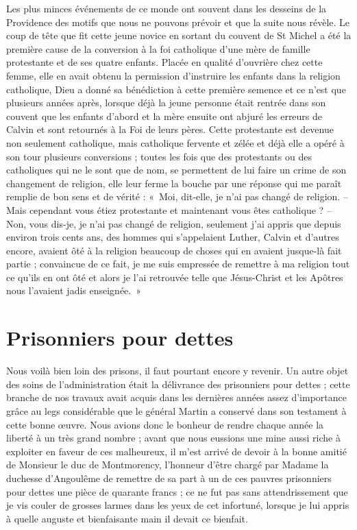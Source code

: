 \documentclass[11pt,a4paper]{report}
\begin{document}
Les plus minces événements de ce monde ont souvent dans les desseins de la Providence des motifs que nous ne pouvons prévoir et que la suite nous révèle. Le coup de tête que fit cette jeune novice en sortant du couvent de St Michel a été la première cause de la conversion à la foi catholique d'une mère de famille protestante et de ses quatre enfants. Placée en qualité d'ouvrière chez cette femme, elle en avait obtenu la permission d'instruire les enfants dans la religion catholique, Dieu a donné sa bénédiction à cette première semence et ce n'est que plusieurs années après, lorsque déjà la jeune personne était rentrée dans son couvent que les enfants d'abord et la mère ensuite ont abjuré les erreurs de Calvin et sont retournés à la Foi de leurs pères. Cette protestante est devenue non seulement catholique, mais catholique fervente et zélée et déjà elle a opéré à son tour plusieurs conversions ; toutes les fois que des protestants ou des catholiques qui ne le sont que de nom, se permettent de lui faire un crime de son changement de religion, elle leur ferme la bouche par une réponse qui me paraît remplie de bon sens et de vérité : «~Moi, dit-elle, je n'ai pas changé de religion.
-- Mais cependant vous étiez protestante et maintenant vous êtes catholique ?
-- Non, vous dis-je, je n'ai pas changé de religion, seulement j'ai appris que depuis environ trois cents ans, des hommes qui s'appelaient Luther, Calvin et d'autres encore, avaient ôté à la religion beaucoup de choses qui en avaient jusque-là fait partie ; convaincue de ce fait, je me suis empressée de remettre à ma religion tout ce qu'ils en ont ôté et alors je l'ai retrouvée telle que Jésus-Christ et les Apôtres nous l'avaient jadis enseignée.~»

\section*{Prisonniers pour dettes}

Nous voilà bien loin des prisons, il faut pourtant encore y revenir. Un autre objet des soins de l'administration était la délivrance des prisonniers pour dettes ; cette branche de nos travaux avait acquis dans les dernières années assez d'importance grâce au legs considérable que le général Martin a conservé dans son testament à cette bonne œuvre. Nous avions donc le bonheur de rendre chaque année la liberté à un très grand nombre ; avant que nous eussions une mine aussi riche à exploiter en faveur de ces malheureux, il m'est arrivé de devoir à la bonne amitié de Monsieur le duc de Montmorency, l'honneur d'être chargé par Madame la duchesse d'Angoulême de remettre de sa part à un de ces pauvres prisonniers pour dettes une pièce de quarante francs ; ce ne fut pas sans attendrissement que je vis couler de grosses larmes dans les yeux de cet infortuné, lorsque je lui appris à quelle auguste et bienfaisante main il devait ce bienfait.
\end{document}
